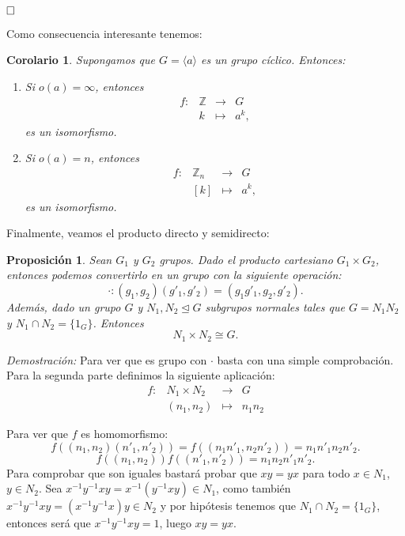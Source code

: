 \documentclass[12pt]{article}
\newtheorem{proposition}[theorem]{Proposición}
\newtheorem{corolario}{Corolario}[theorem]
\begin{document}
$\hfill \square$

Como consecuencia interesante tenemos:

\begin{corolario}
Supongamos que $G = \langle a \rangle$ es un grupo cíclico. Entonces:
\begin{enumerate}
\item Si $o(a) = \infty$, entonces $$\begin{array}{rccl}
f\colon &\mathbb{Z}& \longrightarrow &G\\
&k& \longmapsto &a^{k},
\end{array}
$$ es un isomorfismo.
\item Si $o(a)= n$, entonces $$\begin{array}{rccl}
f\colon &\mathbb{Z}_{n}& \longrightarrow &G\\
&\left[ k \right]& \longmapsto &a^{k},
\end{array}
$$ es un isomorfismo.
\end{enumerate} 
\end{corolario}

Finalmente, veamos el producto directo y semidirecto:

\begin{proposition}Sean $G_{1}$ y $G_{2}$ grupos. Dado el producto cartesiano $G_{1} \times G_{2}$, entonces podemos convertirlo en un grupo con la siguiente operación: $$\cdot \colon (g_{1},g_{2})(g'_{1},g'_{2})=(g_{1}g'_{1},g_{2},g'_{2}).$$
Además, dado un grupo $G$ y $N_{1},N_{2} \unlhd G$ subgrupos normales tales que $G=N_{1}N_{2}$ y $N_{1}\cap N_{2}=\lbrace 1_{G} \rbrace$. Entonces $$N_{1} \times N_{2} \cong G.$$
\end{proposition}
\emph{Demostración: }Para ver que es grupo con $\cdot$ basta con una simple comprobación. Para la segunda parte definimos la siguiente aplicación: 
$$\begin{array}{rccl}
f\colon &N_{1}\times N_{2} & \longrightarrow & G\\
&(n_{1},n_{2})& \longmapsto &n_{1}n_{2}
\end{array}
$$ 

Para ver que $f$ es homomorfismo: $$f((n_{1},n_{2})(n'_{1},n'_{2}))=f((n_{1}n'_{1},n_{2}n'_{2}))=n_{1}n'_{1}n_{2}n'_{2}.$$
$$f((n_{1},n_{2}))f((n'_{1},n'_{2}))=n_{1}n_{2}n'_{1}n'_{2}.$$
Para comprobar que son iguales bastará probar que $xy=yx$ para todo $x\in N_{1}$, $y\in N_{2}$. Sea $x^{-1}y^{-1}xy=x^{-1}(y^{-1}xy)\in N_{1}$, como también $x^{-1}y^{-1}xy=(x^{-1}y^{-1}x)y \in N_{2}$ y por hipótesis tenemos que $N_{1}\cap N_{2} = \lbrace 1_{G}\rbrace$, entonces será que $x^{-1}y^{-1}xy=1$, luego $xy=yx$. 
\end{document}
